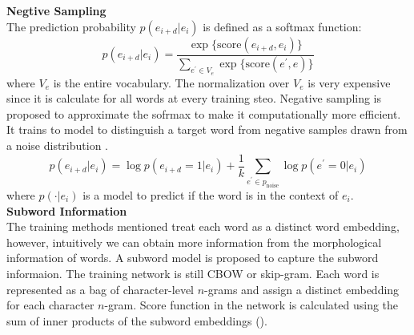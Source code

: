 \textbf{Negtive Sampling}\\
The prediction probability $p(e_{i+d}|e_i)$ is defined as a softmax function:
\[p(e_{i+d}|e_i) = \frac{\exp \{ \text{score}(e_{i+d},e_i)\} }{\sum_{e^{\prime} \in V_e}{\exp  \{ \text{score}(e^{\prime}, e) \}}}\]
where $V_e$ is the entire vocabulary. 
The normalization over $V_e$ is very expensive since it is calculate for all words at every training steo. Negative sampling is proposed to approximate the sofrmax to make it computationally more efficient. It trains to model to distinguish a target word from negative samples drawn from a noise distribution .
\[p(e_{i+d}|e_i) = \log p(e_{i+d}=1| e_i) + \frac{1}{k} \sum_{e^{\prime} \in p_{\text{noise}}}\log p(e^{\prime}=0|e_i)\]
where $p(\cdot| e_i)$ is a model to predict if the word is in the context of $e_i$.\\ 
\textbf{Subword Information}\\
The training methods mentioned treat each word as a distinct word embedding, however, intuitively we can obtain more information from the morphological information of words. A subword model is proposed to capture the subword informaion. The training network is still CBOW or skip-gram. Each word is represented as a bag of character-level $n$-grams and assign a distinct embedding for each character $n$-gram. Score function in the network is calculated using the sum of inner products of the subword embeddings (\cite{DBLP:journals/corr/BojanowskiGJM16}). 
